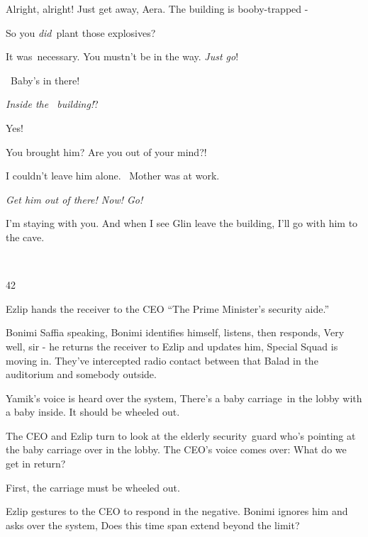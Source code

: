 \documentclass[letterpaper]{article}
\begin{document}
{\textquotedbl}Alright, alright! Just get away, Aera\textcolor[rgb]{0.0,0.4392157,0.7529412}{. T}he building is
booby-trapped -{\textquotedbl} 

{\textquotedbl}So you \textit{did}\textcolor{red}{\ }plant those explosives?{\textquotedbl} 

{\textquotedbl}\textcolor[rgb]{0.0,0.4392157,0.7529412}{I}t was\textcolor[rgb]{0.0,0.4392157,0.7529412}{\ }necessary.
You mustn't be in the way. \textit{Just go}!{\textquotedbl}\ 

~{\textquotedbl}Baby's in there!{\textquotedbl} 

{\textquotedbl}\textit{Inside the~ building!}?{\textquotedbl} 

{\textquotedbl}Yes!{\textquotedbl} 

{\textquotedbl}You brought him? Are you out of your mind?!{\textquotedbl} 

{\textquotedbl}I couldn't leave him alone\textcolor[rgb]{0.0,0.4392157,0.7529412}{.\ } Mother was at
work.{\textquotedbl} 

\textit{{\textquotedbl}Get him out of there! Now! Go!{\textquotedbl} }

{\textquotedbl}I'm staying with you. And when I see Glin leave the building, I'll go with him to the
cave.{\textquotedbl} 

~

42\ \ 

Ezlip hands the receiver to the CEO ``The Prime Minister's security aide.'' 

{\textquotedbl}Bonimi Saffia speaking,{\textquotedbl} Bonimi identifies himself, listens, then responds,
{\textquotedbl}Very well, sir -{\textquotedbl} he returns the receiver to Ezlip and updates him, {\textquotedbl}Special
Squad is moving in. They've intercepted radio contact between that Balad in the auditorium and somebody
outside.{\textquotedbl} 

Yamik's voice is heard over the system, {\textquotedbl}There's a baby carriage\ in the lobby with a baby inside. It
should be wheeled out.{\textquotedbl}

The CEO and Ezlip turn to look at the elderly security\textcolor[rgb]{0.0,0.4392157,0.7529412}{\ }guard who's pointing
at the baby carriage over in the lobby. The CEO's voice comes over: {\textquotedbl}What do we get in
return?{\textquotedbl} 

{\textquotedbl}First, the carriage must be wheeled out.{\textquotedbl} 

Ezlip gestures to the CEO to respond in the negative. Bonimi ignores him and asks over the system, {\textquotedbl}Does
this time span extend beyond the limit?{\textquotedbl}
\end{document}
